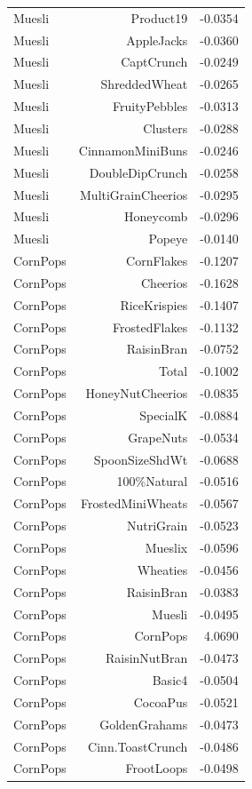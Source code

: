 \begin{longtable}{@{}lrr@{}}
Muesli & Product19 & -0.0354 \\
Muesli & AppleJacks & -0.0360 \\
Muesli & CaptCrunch & -0.0249 \\
Muesli & ShreddedWheat & -0.0265 \\
Muesli & FruityPebbles & -0.0313 \\
Muesli & Clusters & -0.0288 \\
Muesli & CinnamonMiniBuns & -0.0246 \\
Muesli & DoubleDipCrunch & -0.0258 \\
Muesli & MultiGrainCheerios & -0.0295 \\
Muesli & Honeycomb & -0.0296 \\
Muesli & Popeye & -0.0140 \\
CornPops & CornFlakes & -0.1207 \\
CornPops & Cheerios & -0.1628 \\
CornPops & RiceKrispies & -0.1407 \\
CornPops & FrostedFlakes & -0.1132 \\
CornPops & RaisinBran & -0.0752 \\
CornPops & Total & -0.1002 \\
CornPops & HoneyNutCheerios & -0.0835 \\
CornPops & SpecialK & -0.0884 \\
CornPops & GrapeNuts & -0.0534 \\
CornPops & SpoonSizeShdWt & -0.0688 \\
CornPops & 100\%Natural & -0.0516 \\
CornPops & FrostedMiniWheats & -0.0567 \\
CornPops & NutriGrain & -0.0523 \\
CornPops & Mueslix & -0.0596 \\
CornPops & Wheaties & -0.0456 \\
CornPops & RaisinBran & -0.0383 \\
CornPops & Muesli & -0.0495 \\
CornPops & CornPops & 4.0690 \\
CornPops & RaisinNutBran & -0.0473 \\
CornPops & Basic4 & -0.0504 \\
CornPops & CocoaPus & -0.0521 \\
CornPops & GoldenGrahams & -0.0473 \\
CornPops & Cinn.ToastCrunch & -0.0486 \\
CornPops & FrootLoops & -0.0498 \\

\end{longtable}
